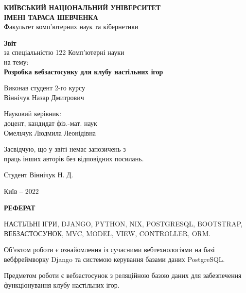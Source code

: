 \documentclass[a4paper, 14pt]{extarticle}
\begin{document}

  \begin{titlepage}
    \begin{center}
      \textbf{КИЇВСЬКИЙ НАЦІОНАЛЬНИЙ УНІВЕРСИТЕТ} \\
      \textbf{ІМЕНІ ТАРАСА ШЕВЧЕНКА} \\
      Факультет комп'ютерних наук та кібернетики \vspace{5em}

      \textbf{Звіт} \\
      за спеціальністю 122 Комп'ютерні науки \\
      на тему: \\
      \textbf{Розробка вебзастосунку для клубу настільних ігор}
    \end{center}
    \vfill
    \begin{flushleft}
      Виконав студент 2-го курсу \\
      Віннічук Назар Дмитрович \vspace{2em}

      Науковий керівник: \\
      доцент, кандидат фіз.-мат. наук \\
      Омельчук Людмила Леонідівна
    \end{flushleft}
    \begin{flushright}
      Засвідчую, що у звіті немає запозичень з \\
      праць інших авторів без відповідних посилань.

      Студент \hspace{7.25em} Віннічук Н. Д.
    \end{flushright}
    \vspace{5em}
    \begin{center}
      Київ -- 2022
    \end{center}
  \end{titlepage}

  \begin{center}
    \textbf{РЕФЕРАТ}
  \end{center}

  НАСТІЛЬНІ ІГРИ, DJANGO, PYTHON, NIX, POSTGRESQL,
  BOOTSTRAP, ВЕБЗАСТОСУНОК, MVC, MODEL, VIEW, CONTROLLER, ORM.

  Об'єктом роботи є ознайомлення із сучасними вебтехнологіями на базі вебфреймворку
  Django та системою керування базами даних PostgreSQL.

  Предметом роботи є вебзастосунок з реляційною базою даних для забезпечення
  функціонування клубу настільних ігор.
\end{document}
